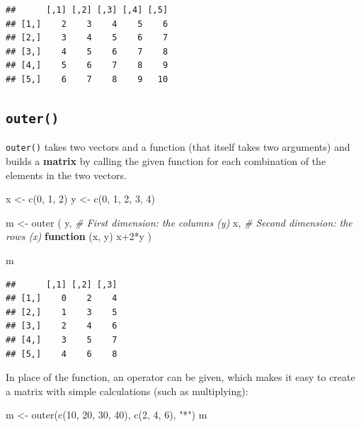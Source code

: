 \documentclass[
]{book}
\newenvironment{Shaded}{\begin{snugshade}}{\end{snugshade}}
\newcommand{\CommentTok}[1]{\textcolor[rgb]{0.56,0.35,0.01}{\textit{#1}}}
\newcommand{\ControlFlowTok}[1]{\textcolor[rgb]{0.13,0.29,0.53}{\textbf{#1}}}
\newcommand{\DecValTok}[1]{\textcolor[rgb]{0.00,0.00,0.81}{#1}}
\newcommand{\FunctionTok}[1]{\textcolor[rgb]{0.00,0.00,0.00}{#1}}
\newcommand{\NormalTok}[1]{#1}
\newcommand{\OtherTok}[1]{\textcolor[rgb]{0.56,0.35,0.01}{#1}}
\newcommand{\SpecialCharTok}[1]{\textcolor[rgb]{0.00,0.00,0.00}{#1}}
\newcommand{\StringTok}[1]{\textcolor[rgb]{0.31,0.60,0.02}{#1}}
\begin{document}
\begin{verbatim}
##      [,1] [,2] [,3] [,4] [,5]
## [1,]    2    3    4    5    6
## [2,]    3    4    5    6    7
## [3,]    4    5    6    7    8
## [4,]    5    6    7    8    9
## [5,]    6    7    8    9   10
\end{verbatim}

\hypertarget{outer}{%
\subsection{\texorpdfstring{\texttt{outer()}}{outer()}}\label{outer}}

\texttt{outer()} takes two vectors and a function (that itself takes two arguments) and builds a \textbf{matrix} by calling the given function for each combination of the elements in the two vectors.

\begin{Shaded}
\begin{Highlighting}[]
\NormalTok{x }\OtherTok{\textless{}{-}} \FunctionTok{c}\NormalTok{(}\DecValTok{0}\NormalTok{, }\DecValTok{1}\NormalTok{, }\DecValTok{2}\NormalTok{)}
\NormalTok{y }\OtherTok{\textless{}{-}} \FunctionTok{c}\NormalTok{(}\DecValTok{0}\NormalTok{, }\DecValTok{1}\NormalTok{, }\DecValTok{2}\NormalTok{, }\DecValTok{3}\NormalTok{, }\DecValTok{4}\NormalTok{)}

\NormalTok{m }\OtherTok{\textless{}{-}} \FunctionTok{outer}\NormalTok{ (}
\NormalTok{   y,     }\CommentTok{\# First dimension:  the columns (y)}
\NormalTok{   x,     }\CommentTok{\# Second dimension: the rows    (x)}
   \ControlFlowTok{function}\NormalTok{ (x, y)   x}\SpecialCharTok{+}\DecValTok{2}\SpecialCharTok{*}\NormalTok{y}
\NormalTok{)}

\NormalTok{m}
\end{Highlighting}
\end{Shaded}

\begin{verbatim}
##      [,1] [,2] [,3]
## [1,]    0    2    4
## [2,]    1    3    5
## [3,]    2    4    6
## [4,]    3    5    7
## [5,]    4    6    8
\end{verbatim}

In place of the function, an operator can be given, which makes it easy to create a matrix with simple calculations (such as multiplying):

\begin{Shaded}
\begin{Highlighting}[]
\NormalTok{m }\OtherTok{\textless{}{-}} \FunctionTok{outer}\NormalTok{(}\FunctionTok{c}\NormalTok{(}\DecValTok{10}\NormalTok{, }\DecValTok{20}\NormalTok{, }\DecValTok{30}\NormalTok{, }\DecValTok{40}\NormalTok{), }\FunctionTok{c}\NormalTok{(}\DecValTok{2}\NormalTok{, }\DecValTok{4}\NormalTok{, }\DecValTok{6}\NormalTok{), }\StringTok{"*"}\NormalTok{)}
\NormalTok{m}
\end{Highlighting}
\end{Shaded}
\end{document}
